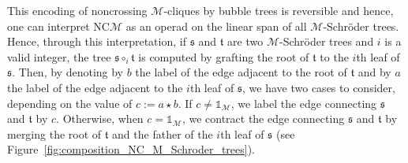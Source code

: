 \documentclass[10pt,reqno]{amsart}
\numberwithin{equation}{subsection}
\newcommand{\Mca}{\mathcal{M}}
\newcommand{\Tfr}{\mathfrak{t}}
\newcommand{\Sfr}{\mathfrak{s}}
\newcommand{\NC}{\mathrm{NC}}
\newcommand{\Unit}{\mathds{1}}
\newcommand{\Op}{\star}
\begin{document}
This encoding of noncrossing $\Mca$-cliques by bubble trees is
reversible and hence, one can interpret $\NC\Mca$ as an operad on the
linear span of all $\Mca$-Schröder trees. Hence, through this
interpretation, if $\Sfr$ and $\Tfr$ are two $\Mca$-Schröder trees and
$i$ is a valid integer, the tree $\Sfr \circ_i \Tfr$ is computed by
grafting the root of $\Tfr$ to the $i$th leaf of $\Sfr$. Then, by
denoting by $b$ the label of the edge adjacent to the root of $\Tfr$ and
by $a$ the label of the edge adjacent to the $i$th leaf of $\Sfr$, we
have two cases to consider, depending on the value of $c := a \Op b$. If
$c \ne \Unit_\Mca$, we label the edge connecting $\Sfr$ and $\Tfr$ by
$c$. Otherwise, when $c = \Unit_\Mca$, we contract the edge connecting
$\Sfr$ and $\Tfr$ by merging the root of $\Tfr$ and the father of the
$i$th leaf of $\Sfr$ (see
Figure~\ref{fig:composition_NC_M_Schroder_trees}).
\end{document}
